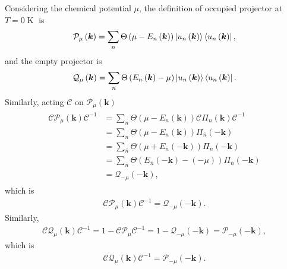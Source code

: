 \documentclass[10pt, oneside]{article}
\begin{document}
Considering the chemical potential \(\mu\), the definition of occupied projector at \(T = 0 \operatorname{K}\) is 
\begin{align}
	\mathcal{P}_{\mu} \left(\bm{k}\right) = \sum_{n } \Theta \left(\mu - E_{n } \left(\bm{k}\right)\right) \ket{u_{n } \left(\bm{k}\right)} \bra{u_{n } \left(\bm{k}\right)},
\end{align}
and the empty projector is 
\begin{align}
	\mathcal{Q}_{\mu } \left(\bm{k}\right) = \sum_{n } \Theta \left(E_{n } \left(\bm{k}\right) - \mu\right) \ket{u_{n } \left(\bm{k}\right)} \bra{u_{n } \left(\bm{k}\right)}.
\end{align}
Similarly, acting \(\mathcal{C}\) on \(\mathcal{P}_{\mu} \left(\bm{k}\right)\) 
\begin{align}
	\begin{split}
		\mathcal{C} \mathcal{P}_{\mu} \left(\bm{k}\right) \mathcal{C}^{-1}  & = \sum_{n }  \Theta \left(\mu - E_{n } \left(\bm{k}\right)\right) \mathcal{C} \Pi_{n } \left(\bm{k}\right) \mathcal{C}^{-1} \\
		& = \sum_{n } \Theta \left(\mu - E_{n } \left(\bm{k}\right)	\right) \Pi_{\bar{n } } \left( - \bm{k}\right) \\
		& = \sum_{\bar{n }} \Theta \left(\mu + E_{\bar{n }} \left( - \bm{k}\right) \right)	\Pi_{\bar{n }} \left(-\bm{k}\right) \\ 
		& = \sum_{\bar{n }} \Theta \left(E_{\bar{n }} \left(-\bm{k}\right) - \left(- \mu\right)\right)  \Pi_{\bar{n } } \left( - \bm{k}\right)  \\
		& = \mathcal{Q}_{- \mu} \left( -\bm{k}\right),
	\end{split}
\end{align}
which is 
\begin{align}
	\boxed{
		\mathcal{C} \mathcal{P}_{\mu} \left(\bm{k}\right) \mathcal{C}^{-1} =  \mathcal{Q}_{- \mu} \left( -\bm{k}\right).
	}
\end{align}
Similarly, 
\begin{align}
	\mathcal{C} \mathcal{Q}_{\mu} \left(\bm{k}\right) \mathcal{C}^{-1}  = 1 - \mathcal{C} \mathcal{P}_{\mu} \mathcal{C}^{-1} = 1 - \mathcal{Q}_{-\mu} \left( -\bm{k}\right) = \mathcal{P}_{- \mu} \left(-\bm{k}\right),
\end{align}
which is 
\begin{align}
	\boxed{
		\mathcal{C} \mathcal{Q}_{\mu} \left(\bm{k}\right) \mathcal{C}^{-1} = \mathcal{P}_{ - \mu} \left(-\bm{k}\right).
	}
\end{align}
\end{document}
